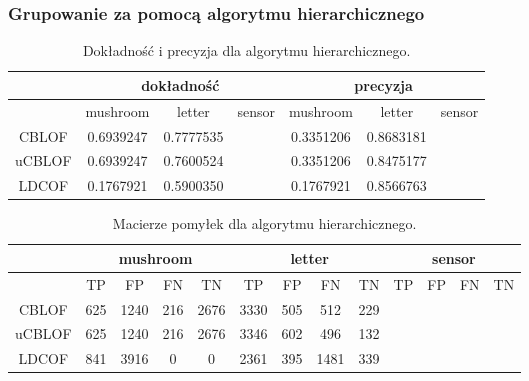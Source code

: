\documentclass[11pt,a4paper,twoside]{article}
\begin{document}
\subsubsection{Grupowanie za pomocą algorytmu hierarchicznego }

\begin{table}[ht]
\centering
\caption{Dokładność i precyzja dla algorytmu hierarchicznego.}
\label{accPrec_v2}
\begin{tabular}{|*{7}{c|}}
\hline
 & \multicolumn{3}{c|}{dokładność} & \multicolumn{3}{c|}{precyzja} \\\hline
 & mushroom & letter & sensor & mushroom & letter & sensor \\\hline
 CBLOF &     0.6939247    &     0.7777535   &       &   0.3351206  &   0.8683181  &       \\\hline
 uCBLOF &  0.6939247   &     0.7600524   &       &   0.3351206  &  0.8475177  &   \\\hline
 LDCOF &    0.1767921      &     0.5900350    &       &  0.1767921   &   0.8566763   &       \\\hline
\end{tabular}
\end{table}


\begin{table}[H]
\centering
\caption{Macierze pomyłek dla algorytmu hierarchicznego.}
\label{confMatrix_v1}
\begin{tabular}{|*{13}{c|}}
\hline
 & \multicolumn{4}{c|}{mushroom} & \multicolumn{4}{c|}{letter} & \multicolumn{4}{c|}{sensor} \\\hline
 & TP & FP & FN & TN  & TP & FP & FN & TN  & TP & FP & FN & TN \\\hline
 CBLOF &     625    &   1240      &   216    &    2676    &    3330   &   505   &   512      &   229   & & & &      \\\hline
 uCBLOF &   625    &   1240      &    216    &    2676   &    3346   &   602   &   496      &   132   & & &   &    \\\hline
 LDCOF &     841    &    3916     &    0       &     0         &    2361   &   395   &   1481    &   339    & & &  &  \\\hline
\end{tabular}
\end{table}
\end{document}
